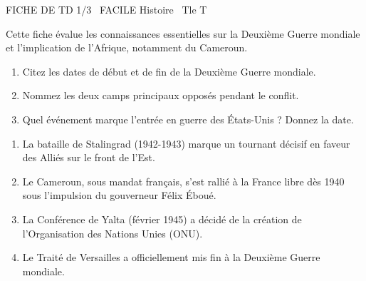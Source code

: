 \documentclass[11pt]{article}
\begin{document}
\begin{tcolorbox}[enhanced,colback=popink,colframe=popink,arc=10pt,boxrule=0pt,left=12pt,right=12pt,top=9pt,bottom=9pt]
{\color{white}\popxbold\small FICHE DE TD 1/3 \textbullet\ FACILE \hfill Histoire \textbullet\ Tle T\par}
\end{tcolorbox}
\vspace{4pt}
Cette fiche évalue les connaissances essentielles sur la Deuxième Guerre mondiale et l'implication de l'Afrique, notamment du Cameroun.

\begin{exercice}
\begin{enumerate}
    \item Citez les dates de début et de fin de la Deuxième Guerre mondiale.
    \item Nommez les deux camps principaux opposés pendant le conflit.
    \item Quel événement marque l'entrée en guerre des États-Unis ? Donnez la date.
\end{enumerate}
\end{exercice}

\begin{exercice}
\begin{enumerate}
    \item La bataille de Stalingrad (1942-1943) marque un tournant décisif en faveur des Alliés sur le front de l'Est.
    \item Le Cameroun, sous mandat français, s'est rallié à la France libre dès 1940 sous l'impulsion du gouverneur Félix Éboué.
    \item La Conférence de Yalta (février 1945) a décidé de la création de l'Organisation des Nations Unies (ONU).
    \item Le Traité de Versailles a officiellement mis fin à la Deuxième Guerre mondiale.
\end{enumerate}
\end{exercice}
\end{document}
